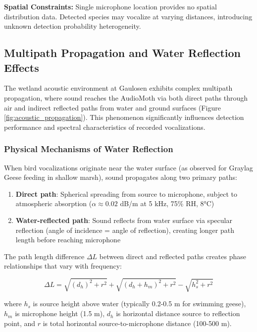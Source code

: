 \documentclass[twocolumn]{article}
\begin{document}
\textbf{Spatial Constraints:} Single microphone location provides no spatial distribution data. Detected species may vocalize at varying distances, introducing unknown detection probability heterogeneity.

\subsection{Multipath Propagation and Water Reflection Effects}

The wetland acoustic environment at Gaulosen exhibits complex multipath propagation, where sound reaches the AudioMoth via both direct paths through air and indirect reflected paths from water and ground surfaces (Figure \ref{fig:acoustic_propagation}). This phenomenon significantly influences detection performance and spectral characteristics of recorded vocalizations.

\subsubsection{Physical Mechanisms of Water Reflection}

When bird vocalizations originate near the water surface (as observed for Graylag Geese feeding in shallow marsh), sound propagates along two primary paths:

\begin{enumerate}
\item \textbf{Direct path}: Spherical spreading from source to microphone, subject to atmospheric absorption ($\alpha \approx 0.02$ dB/m at 5 kHz, 75\% RH, 8°C)

\item \textbf{Water-reflected path}: Sound reflects from water surface via specular reflection (angle of incidence = angle of reflection), creating longer path length before reaching microphone
\end{enumerate}

The path length difference $\Delta L$ between direct and reflected paths creates phase relationships that vary with frequency:

\begin{equation}
\Delta L = \sqrt{(d_h)^2 + r^2} + \sqrt{(d_h + h_m)^2 + r^2} - \sqrt{h_s^2 + r^2}
\end{equation}

where $h_s$ is source height above water (typically 0.2-0.5 m for swimming geese), $h_m$ is microphone height (1.5 m), $d_h$ is horizontal distance source to reflection point, and $r$ is total horizontal source-to-microphone distance (100-500 m).
\end{document}
